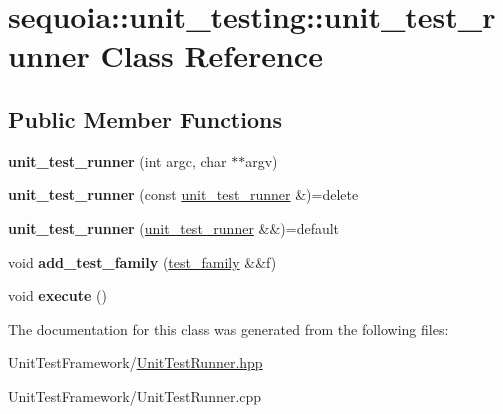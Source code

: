 \hypertarget{classsequoia_1_1unit__testing_1_1unit__test__runner}{}\section{sequoia\+::unit\+\_\+testing\+::unit\+\_\+test\+\_\+runner Class Reference}
\label{classsequoia_1_1unit__testing_1_1unit__test__runner}
\subsection*{Public Member Functions}
\begin{DoxyCompactItemize}
\item 
\mbox{\label{classsequoia_1_1unit__testing_1_1unit__test__runner_a6aebc64c38a644f464952fd0d1a41050}} 
{\bfseries unit\+\_\+test\+\_\+runner} (int argc, char $\ast$$\ast$argv)
\item 
\mbox{\label{classsequoia_1_1unit__testing_1_1unit__test__runner_a6046293aa9bbee774c6738af8199a863}} 
{\bfseries unit\+\_\+test\+\_\+runner} (const \mbox{\hyperlink{classsequoia_1_1unit__testing_1_1unit__test__runner}{unit\+\_\+test\+\_\+runner}} \&)=delete
\item 
\mbox{\label{classsequoia_1_1unit__testing_1_1unit__test__runner_aff61b83f284b35bc3e294e783e24a0dc}} 
{\bfseries unit\+\_\+test\+\_\+runner} (\mbox{\hyperlink{classsequoia_1_1unit__testing_1_1unit__test__runner}{unit\+\_\+test\+\_\+runner}} \&\&)=default
\item 
\mbox{\label{classsequoia_1_1unit__testing_1_1unit__test__runner_aa77d68f11b0c9ca78abf361a1a289f3f}} 
void {\bfseries add\+\_\+test\+\_\+family} (\mbox{\hyperlink{classsequoia_1_1unit__testing_1_1test__family}{test\+\_\+family}} \&\&f)
\item 
\mbox{\label{classsequoia_1_1unit__testing_1_1unit__test__runner_aae0e5602131230be54bcab3de07264b3}} 
void {\bfseries execute} ()
\end{DoxyCompactItemize}


The documentation for this class was generated from the following files\+:\begin{DoxyCompactItemize}
\item 
Unit\+Test\+Framework/\mbox{\hyperlink{_unit_test_runner_8hpp}{Unit\+Test\+Runner.\+hpp}}\item 
Unit\+Test\+Framework/Unit\+Test\+Runner.\+cpp\end{DoxyCompactItemize}
